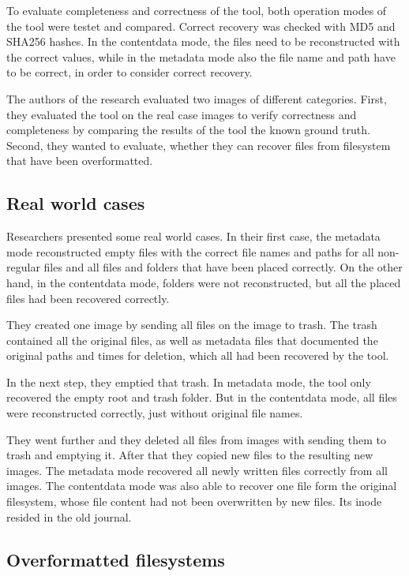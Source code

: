 \documentclass{acm_proc_article-sp}
\begin{document}
To evaluate completeness and correctness of the tool, both operation modes of the tool were testet and compared. Correct recovery was checked with MD5 and SHA256 hashes. In the contentdata mode, the files need to be reconstructed with the correct values, while in the metadata mode also the file name and path have to be correct, in order to consider correct recovery.

The authors of the research evaluated two images of different categories. First, they evaluated the tool on the real case images to verify correctness and completeness by comparing the results of the tool the known ground truth. Second, they wanted to evaluate, whether they can recover files from filesystem that have been overformatted.

\subsection{Real world cases}

Researchers presented some real world cases. In their first case, the metadata mode reconstructed empty files with the correct file names and paths for all non-regular files and all files and folders that have been
placed correctly. On the other hand, in the contentdata mode, folders were not reconstructed, but all the placed files had been recovered correctly.

They created one image by sending all files on the image to trash. The trash contained all the original files, as well as metadata files that documented the original paths and times for deletion, which all had been recovered by the tool.

In the next step, they emptied that trash. In metadata mode, the tool only recovered the empty root and trash folder. But in the contentdata mode, all files were reconstructed correctly, just without original file names. 

They went further and they deleted all files from images with sending them to trash and emptying it. After that they copied new files to the resulting new images. The metadata mode recovered all newly written files correctly from all images. The contentdata mode was also able to recover one file form the original filesystem, whose file content had not been overwritten by new files. Its inode resided in the old journal.


\subsection{Overformatted filesystems}
\end{document}
